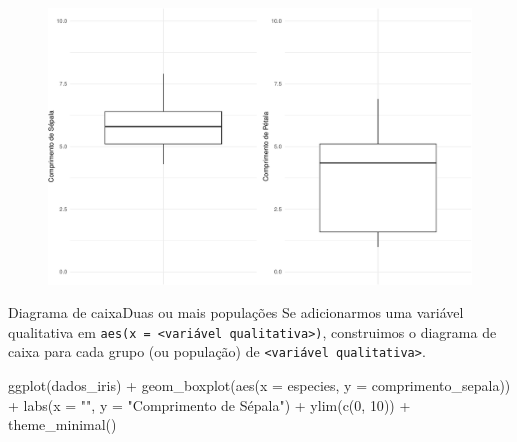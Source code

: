 \documentclass[
  10pt,
  ignorenonframetext,
]{beamer}
\newenvironment{Shaded}{\begin{snugshade}}{\end{snugshade}}
\newcommand{\AttributeTok}[1]{\textcolor[rgb]{0.40,0.45,0.13}{#1}}
\newcommand{\DecValTok}[1]{\textcolor[rgb]{0.68,0.00,0.00}{#1}}
\newcommand{\FunctionTok}[1]{\textcolor[rgb]{0.28,0.35,0.67}{#1}}
\newcommand{\NormalTok}[1]{\textcolor[rgb]{0.00,0.23,0.31}{#1}}
\newcommand{\SpecialCharTok}[1]{\textcolor[rgb]{0.37,0.37,0.37}{#1}}
\newcommand{\StringTok}[1]{\textcolor[rgb]{0.13,0.47,0.30}{#1}}
\begin{document}
\begin{frame}
\begin{figure}

{\centering \includegraphics[width=1\textwidth,height=\textheight]{exploracao-visualizacao_files/figure-beamer/unnamed-chunk-84-1.pdf}

}

\end{figure}
\end{frame}

\begin{frame}[fragile]{Diagrama de caixa\newline Duas ou mais
populações}
\protect\hypertarget{diagrama-de-caixaduas-ou-mais-populauxe7uxf5es}{}
Se adicionarmos uma variável qualitativa em
\texttt{aes(x\ =\ \textless{}variável\ qualitativa\textgreater{})},
construimos o diagrama de caixa para cada grupo (ou população) de
\texttt{\textless{}variável\ qualitativa\textgreater{}}.

\vfill

\begin{Shaded}
\begin{Highlighting}[]
\FunctionTok{ggplot}\NormalTok{(dados\_iris) }\SpecialCharTok{+}
  \FunctionTok{geom\_boxplot}\NormalTok{(}\FunctionTok{aes}\NormalTok{(}\AttributeTok{x =}\NormalTok{ especies, }\AttributeTok{y =}\NormalTok{ comprimento\_sepala)) }\SpecialCharTok{+}
  \FunctionTok{labs}\NormalTok{(}\AttributeTok{x =} \StringTok{""}\NormalTok{, }\AttributeTok{y =} \StringTok{"Comprimento de Sépala"}\NormalTok{) }\SpecialCharTok{+}
  \FunctionTok{ylim}\NormalTok{(}\FunctionTok{c}\NormalTok{(}\DecValTok{0}\NormalTok{, }\DecValTok{10}\NormalTok{)) }\SpecialCharTok{+}
  \FunctionTok{theme\_minimal}\NormalTok{()}
\end{Highlighting}
\end{Shaded}
\end{frame}
\end{document}
